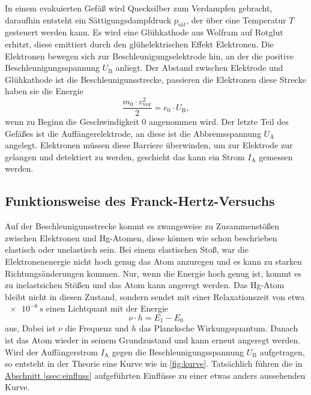 In einem evakuierten Gefäß wird Quecksilber zum Verdampfen gebracht, daraufhin entsteht ein Sättigungsdampfdruck $p_\text{sät}$, der über eine Temperatur $T$ gesteuert werden kann.
Es wird eine Glühkathode aus Wolfram auf Rotglut erhitzt, diese emittiert durch den glühelektrischen Effekt Elektronen.
Die Elektronen bewegen sich zur Beschleunigungselektrode hin, an der die positive Beschleunigungsspannung $U_\text{B}$ anliegt. 
Der Abstand zwischen Elektrode und Glühkathode ist die Beschleunigunsstrecke, passieren die Elektronen diese Strecke haben sie die Energie
\begin{equation}
    \frac{m_0 \cdot v^2_\text{vor}}{2} = e_0 \cdot U_\text{B},
    \label{eq:beschleu}
\end{equation}
wenn zu Beginn die Geschwindigkeit 0 angenommen wird.
Der letzte Teil des Gefäßes ist die Auffängerelektrode, an diese ist die Abbremsspannung $U_\text{A}$ angelegt.
Elektronen müssen diese Barriere überwinden, um zur Elektrode zur gelangen und detektiert zu werden, geschieht das kann ein Strom $I_\text{A}$ gemessen werden.

\subsection{Funktionsweise des Franck-Hertz-Versuchs}
\label{ssec:funktion}

Auf der Beschleunigunsstrecke kommt es zwangsweise zu Zusammenstößen zwischen Elektronen und Hg-Atomen, diese können wie schon beschrieben elastisch oder unelastisch sein.
Bei einem elastischen Stoß, war die Elektronenenergie nicht hoch genug das Atom anzuregen und es kann zu starken Richtungsänderungen kommen.
Nur, wenn die Energie hoch genug ist, kommt es zu inelastsichen Stößen und das Atom kann angeregt werden.
Das Hg-Atom bleibt nicht in diesen Zustand, sondern sendet mit einer Relaxationszeit von etwa $\SI{e-8}{\second}$ einen Lichtquant mit der Energie
\begin{equation}
    \nu \cdot h = E_1 - E_0
    \label{eq:quant}
\end{equation}
aus, Dabei ist $\nu$ die Frequenz und $h$ das Plancksche Wirkungsquantum.
Danach ist das Atom wieder in seinem Grundzustand und kann erneut angeregt werden.
Wird der Auffängerstrom $I_\text{A}$ gegen die Beschleunigungsspannung $U_\text{B}$ aufgetragen, so entsteht in der Theorie eine Kurve wie in \autoref{fig:kurve}.
Tatsächlich führen die in \hyperref[ssec:einfluss]{Abschnitt \ref*{ssec:einfluss}} aufgeführten Einflüsse zu einer etwas anders aussehenden Kurve.

